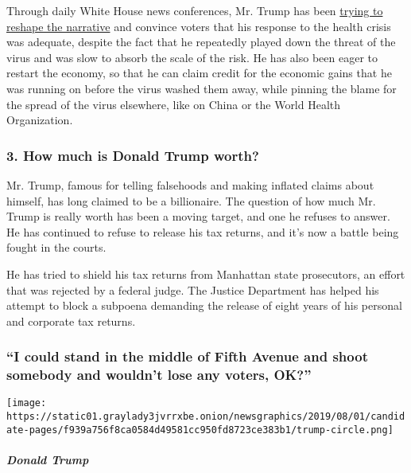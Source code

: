 Through daily White House news conferences, Mr. Trump has been
\href{https://www.nytimes3xbfgragh.onion/interactive/2020/04/26/us/politics/trump-coronavirus-briefings-analyzed.html}{trying
to reshape the narrative} and convince voters that his response to the
health crisis was adequate, despite the fact that he repeatedly played
down the threat of the virus and was slow to absorb the scale of the
risk. He has also been eager to restart the economy, so that he can
claim credit for the economic gains that he was running on before the
virus washed them away, while pinning the blame for the spread of the
virus elsewhere, like on China or the World Health Organization.

\hypertarget{3-how-much-is-donald-trump-worth}{%
\subsubsection{\texorpdfstring{\textbf{3. How much is Donald Trump
worth?}}{3. How much is Donald Trump worth?}}\label{3-how-much-is-donald-trump-worth}}

Mr. Trump, famous for telling falsehoods and making inflated claims
about himself, has long claimed to be a billionaire. The question of how
much Mr. Trump is really worth has been a moving target, and one he
refuses to answer. He has continued to refuse to release his tax
returns, and it's now a battle being fought in the courts.

He has tried to shield his tax returns from Manhattan state prosecutors,
an effort that was rejected by a federal judge. The Justice Department
has helped his attempt to block a subpoena demanding the release of
eight years of his personal and corporate tax returns.

\hypertarget{i-could-stand-in-the-middle-of-fifth-avenue-and-shoot-somebody-and-wouldnt-lose-any-voters-ok}{%
\subsubsection{``I could stand in the middle of Fifth Avenue and shoot
somebody and wouldn't lose any voters,
OK?''}\label{i-could-stand-in-the-middle-of-fifth-avenue-and-shoot-somebody-and-wouldnt-lose-any-voters-ok}}

\texttt{[image: https://static01.graylady3jvrrxbe.onion/newsgraphics/2019/08/01/candidate-pages/f939a756f8ca0584d49581cc950fd8723ce383b1/trump-circle.png]}

\hypertarget{donald-trump-1}{%
\subparagraph{Donald Trump}\label{donald-trump-1}}

